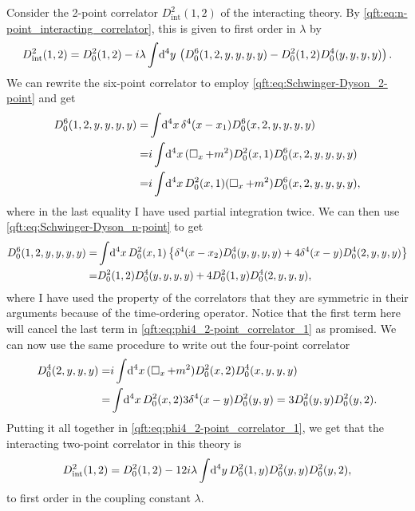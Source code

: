 \documentclass[../main.tex]{subfiles}
\begin{document}
Consider the 2-point correlator \(D_{\text{int}}^2(1,2)\) of the interacting theory.
By \cref{qft:eq:n-point_interacting_correlator}, this is given to first order in \(\lambda\) by
\begin{equation}
  \label{qft:eq:phi4_2-point_correlator_1}
  D_{\text{int}}^2(1,2) = D_0^2(1,2) - i\lambda \int \!\mathrm{d}^4y\, \left(D_0^6(1,2,y,y,y,y) - D_0^2(1,2)D_0^4(y,y,y,y)\right).
\end{equation}
We can rewrite the six-point correlator to employ \cref{qft:eq:Schwinger-Dyson_2-point} and get
\begin{align}
  \nonumber
  D_0^6(1,2,y,y,y,y) = & \int \!\mathrm{d}^4x\, \delta^4(x-x_1) D_0^6(x,2,y,y,y,y)            \\
  \nonumber
  =                    & i\int \!\mathrm{d}^4x\, (\operatorname{\Box}_x + m^2) D^2_0(x,1) D_0^6(x,2,y,y,y,y)  \\
  =                    & i\int \!\mathrm{d}^4x\, D^2_0(x,1) (\operatorname{\Box}_x + m^2) D_0^6(x,2,y,y,y,y),
\end{align}
where in the last equality I have used partial integration twice.
We can then use \cref{qft:eq:Schwinger-Dyson_n-point} to get
\begin{align}
  \nonumber
  D_0^6(1,2,y,y,y,y) = & \int \!\mathrm{d}^4x\, D^2_0(x,1) \left\{\delta^4(x-x_2) D_0^4(y,y,y,y) + 4\delta^4(x-y)D_0^4(2,y,y,y)\right\} \\
  =                    & D_0^2(1,2) D_0^4(y,y,y,y) + 4 D_0^2(1,y)D_0^4(2,y,y,y),
\end{align}
where I have used the property of the correlators that they are symmetric in their arguments because of the time-ordering operator.
Notice that the first term here will cancel the last term in \cref{qft:eq:phi4_2-point_correlator_1} as promised.
We can now use the same procedure to write out the four-point correlator
\begin{align}
  \nonumber
  D_0^4(2,y,y,y) = & i\int \!\mathrm{d}^4x\, (\operatorname{\Box}_x + m^2) D_0^2(x,2) D_0^4(x,y,y,y)                        \\
  =                & \int \!\mathrm{d}^4x\, D_0^2(x,2) 3 \delta^4(x-y) D_0^2(y,y) = 3D_0^2(y,y) D_0^2(y,2).
\end{align}
Putting it all together in \cref{qft:eq:phi4_2-point_correlator_1}, we get that the interacting two-point correlator in this theory is
\begin{equation}
  \label{qft:eq:phi4_2-point_correlator_2}
  D_{\text{int}}^2(1, 2) = D_0^2(1, 2) - 12 i \lambda \int \!\mathrm{d}^4y\, D_0^2(1, y) D_0^2(y, y) D_0^2(y, 2),
\end{equation}
to first order in the coupling constant \(\lambda\).
\end{document}
